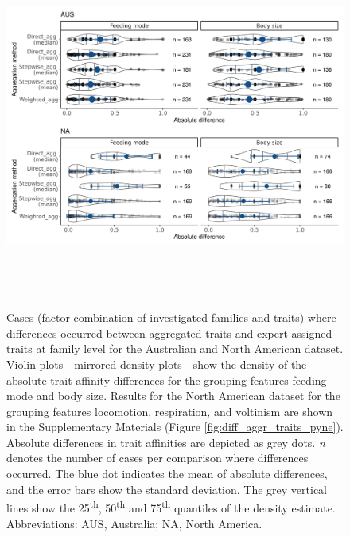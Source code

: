 \documentclass[12pt]{article}
\begin{document}
\begin{figure}[H]
  \centering
  \includegraphics[width=16.5cm, height=12cm]{Deviances_trait_agg_combined.png}
  \caption{Cases (factor combination of investigated families and traits) where differences occurred between aggregated traits and expert assigned traits at family level for the Australian and North American dataset. Violin plots - mirrored density plots - show the density of the absolute trait affinity differences for the grouping features feeding mode and body size. Results for the North American dataset for the grouping features locomotion, respiration, and voltinism are shown in the Supplementary Materials (Figure \ref{fig:diff_aggr_traits_pyne}). Absolute differences in trait affinities are depicted as grey dots. \textit{n} denotes the number of cases per comparison where differences occurred. The blue dot indicates the mean of absolute differences, and the error bars show the standard deviation. The grey vertical lines show the 25\textsuperscript{th}, 50\textsuperscript{th} and 75\textsuperscript{th} quantiles of the density estimate. Abbreviations: AUS, Australia; NA, North America.}
  \label{fig:diff_aggr_traits_combined}
\end{figure}
\end{document}
